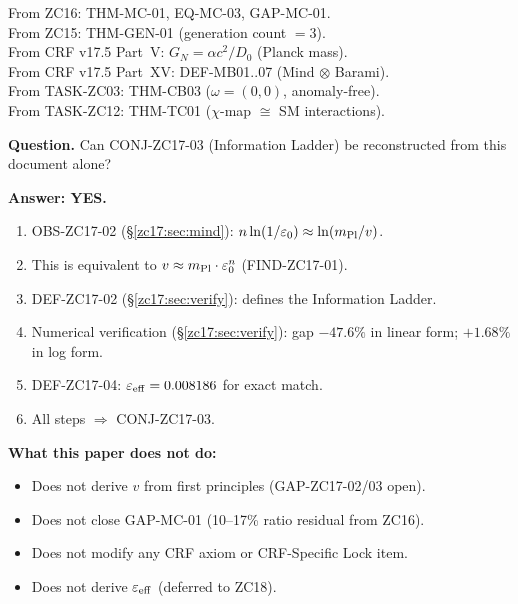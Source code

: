 \documentclass[12pt, a4paper]{article}
\begin{document}
\begin{formalbox}[title={Atomic units inherited (not modified)}]
From ZC16: THM-MC-01, EQ-MC-03, GAP-MC-01.\\
From ZC15: THM-GEN-01 (generation count $=3$).\\
From CRF v17.5 Part~V: $G_N = \alpha c^2/D_0$ (Planck mass).\\
From CRF v17.5 Part~XV: DEF-MB01..07 (Mind $\otimes$ Barami).\\
From TASK-ZC03: THM-CB03 ($\omega=(0,0)$, anomaly-free).\\
From TASK-ZC12: THM-TC01 ($\chi$-map $\cong$ SM interactions).
\end{formalbox}

\begin{formalbox}[title={Reconstruction Test (CUIP No-Loss)}]
\textbf{Question.} Can CONJ-ZC17-03 (Information Ladder) be
reconstructed from this document alone?

\textbf{Answer: YES.}
\begin{enumerate}[leftmargin=*, noitemsep]
  \item OBS-ZC17-02 (\S\ref{zc17:sec:mind}): $n\ln(1/\varepsilon_0)\approx\ln(m_{\rm Pl}/v)$.
  \item This is equivalent to $v\approx m_{\rm Pl}\cdot\varepsilon_0^n$ (FIND-ZC17-01).
  \item DEF-ZC17-02 (\S\ref{zc17:sec:verify}): defines the Information Ladder.
  \item Numerical verification (\S\ref{zc17:sec:verify}): gap $-47.6\%$ in
    linear form; $+1.68\%$ in log form.
  \item DEF-ZC17-04: $\varepsilon_{\rm eff}=0.008186$ for exact match.
  \item All steps $\Rightarrow$ CONJ-ZC17-03.
\end{enumerate}

\textbf{What this paper does not do:}
\begin{itemize}[leftmargin=*, noitemsep]
  \item Does not derive $v$ from first principles (GAP-ZC17-02/03 open).
  \item Does not close GAP-MC-01 (10--17\% ratio residual from ZC16).
  \item Does not modify any CRF axiom or CRF-Specific Lock item.
  \item Does not derive $\varepsilon_{\rm eff}$ (deferred to ZC18).
\end{itemize}
\end{formalbox}
\end{document}
